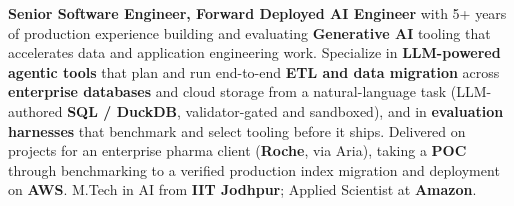\documentclass[letter,10pt]{article}
\begin{document}

\textbf{Senior Software Engineer, Forward Deployed AI Engineer} with 5+ years of production experience building and evaluating \textbf{Generative AI} tooling that accelerates data and application engineering work.
Specialize in \textbf{LLM-powered agentic tools} that plan and run end-to-end \textbf{ETL and data migration} across \textbf{enterprise databases} and cloud storage from a natural-language task (LLM-authored \textbf{SQL / DuckDB}, validator-gated and sandboxed), and in \textbf{evaluation harnesses} that benchmark and select tooling before it ships.
Delivered on projects for an enterprise pharma client (\textbf{Roche}, via Aria), taking a \textbf{POC} through benchmarking to a verified production index migration and deployment on \textbf{AWS}.
M.Tech in AI from \textbf{IIT Jodhpur}; Applied Scientist at \textbf{Amazon}.
\end{document}
